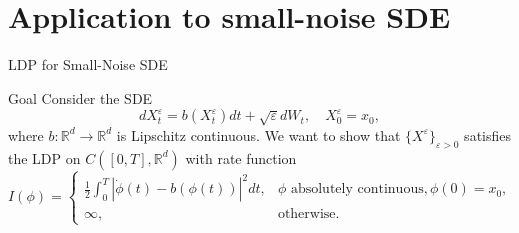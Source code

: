 \documentclass{if-beamer}
\begin{document}
\section{Application to small-noise SDE}

\begin{frame}{LDP for Small-Noise SDE}
    \begin{block}{Goal}
    Consider the SDE
    \[
        dX^{\varepsilon}_t = b(X^{\varepsilon}_t) dt + \sqrt{\varepsilon} dW_t, \quad X^{\varepsilon}_0 = x_0,
    \]
    where $b: \mathbb{R}^d \to \mathbb{R}^d$ is Lipschitz continuous. We want to show that $\{X^{\varepsilon}\}_{\varepsilon > 0}$ satisfies the LDP on $C([0, T], \mathbb{R}^d)$ with rate function
    \[
        I(\phi) = \begin{cases}
            \frac{1}{2} \int_0^T |\dot{\phi}(t) - b(\phi(t))|^2 dt, & \phi \text{ absolutely continuous}, \phi(0) = x_0,\\
            \infty, & \text{otherwise}.
        \end{cases}
    \]
    \end{block}
\end{frame}
\end{document}
